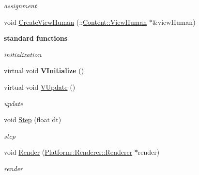 \begin{DoxyCompactItemize}
\begin{DoxyCompactList}\small\item\em assignment \item\end{DoxyCompactList}\item 
void \hyperlink{classContent_1_1Scene_abfc7b71be87293aba330902c9c9fbc41}{CreateViewHuman} (::\hyperlink{classContent_1_1ViewHuman}{Content::ViewHuman} $\ast$\&viewHuman)
\end{DoxyCompactItemize}
\begin{Indent}{\bf standard functions}\par
{\em \label{_amgrp57f1c50bd31a278c7d9f58b3e669c84c}
 initialization }\begin{DoxyCompactItemize}
\item 
\hypertarget{classContent_1_1Scene_a706fbd66a188667d4353f2e0db273ad1}{
virtual void {\bfseries VInitialize} ()}
\label{classContent_1_1Scene_a706fbd66a188667d4353f2e0db273ad1}

\item 
\hypertarget{classContent_1_1Scene_a5c00bfb6b5472ca9f3e4aa959003dc1c}{
virtual void \hyperlink{classContent_1_1Scene_a5c00bfb6b5472ca9f3e4aa959003dc1c}{VUpdate} ()}
\label{classContent_1_1Scene_a5c00bfb6b5472ca9f3e4aa959003dc1c}

\begin{DoxyCompactList}\small\item\em update \item\end{DoxyCompactList}\item 
\hypertarget{classContent_1_1Scene_a65c9548fe3a5ec1ce7973abfdec8edba}{
void \hyperlink{classContent_1_1Scene_a65c9548fe3a5ec1ce7973abfdec8edba}{Step} (float dt)}
\label{classContent_1_1Scene_a65c9548fe3a5ec1ce7973abfdec8edba}

\begin{DoxyCompactList}\small\item\em step \item\end{DoxyCompactList}\item 
\hypertarget{classContent_1_1Scene_a02ccf4e7a4cb1ba6f422261b3874b0db}{
void \hyperlink{classContent_1_1Scene_a02ccf4e7a4cb1ba6f422261b3874b0db}{Render} (\hyperlink{classPlatform_1_1Renderer_1_1Renderer}{Platform::Renderer::Renderer} $\ast$render)}
\label{classContent_1_1Scene_a02ccf4e7a4cb1ba6f422261b3874b0db}

\begin{DoxyCompactList}\small\item\em render \item\end{DoxyCompactList}\end{DoxyCompactItemize}
\end{Indent}
